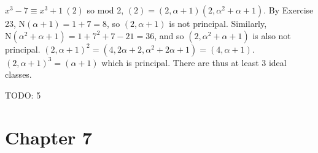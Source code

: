 \documentclass{article}
\newcommand{\norm}[0]{\text{N}}
\newcommand{\modequiv}[3]{#1 \equiv #2\ (#3)}
\begin{document}
\begin{enumerate}
    $\modequiv{x^3 - 7}{x^3 + 1}{2}$ so mod 2, $(2) = (2, \alpha + 1)(2, \alpha^2 + \alpha + 1)$.  By Exercise 23, $\norm(\alpha + 1) = 1 + 7 = 8$, so $(2, \alpha + 1)$ is not principal.  Similarly, $\norm(\alpha^2 + \alpha + 1) = 1 + 7^2 + 7 - 21 = 36$, and so $(2, \alpha^2 + \alpha + 1)$ is also not principal.  $(2, \alpha + 1)^2 = (4, 2\alpha+2, \alpha^2 + 2\alpha + 1) = (4, \alpha + 1)$.  $(2, \alpha + 1)^3 = (\alpha + 1)$ which is principal.  There are thus at least 3 ideal classes.

    TODO: 5

\end{enumerate}

\section*{Chapter 7}
\end{document}
